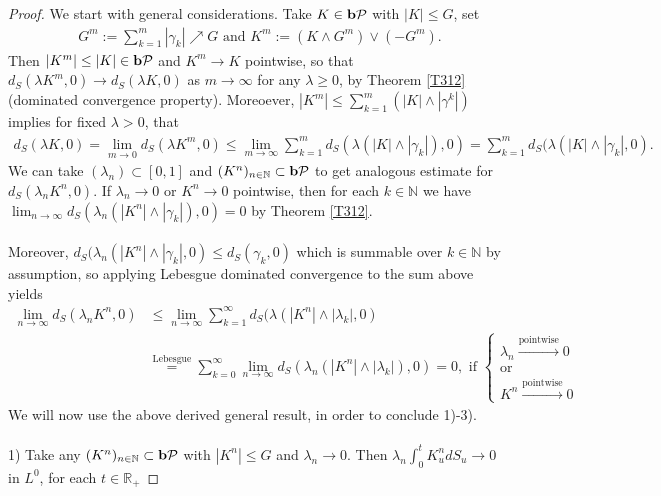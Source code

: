 \documentclass[12pt,a4paper, twoside]{article}
\theoremstyle{definition}
\newcommand{\pred}{\textbf{\text{b}}\mathcal{P}}
\begin{document}
\begin{proof}
We start with general considerations. Take $K \in \pred$ with $|K | \leq G$, set 
\begin{align*}
G^m:= \sum_{k=1}^m | \gamma_k| \nearrow G \text{ and } K^m:= (K \wedge G^m) \vee (- G^m).
\end{align*}
Then $|K^m| \leq |K| \in \pred$ and $K^m \to K$ pointwise,  so that $d_S( \lambda K^m,0) \to d_S( \lambda K,0)$ as $m \to \infty$ for any $\lambda \geq 0$, by Theorem \ref{T312} (dominated convergence property). Moreoever, $|K^m| \leq \sum_{k=1}^m ( |K| \wedge | \gamma^k|)$ implies for fixed $\lambda >0$, that 
\begin{align*}
d_S( \lambda K,0) = \lim_{m \to 0} d_S( \lambda K^m, 0) \leq \lim_{m \to \infty} \sum_{k=1}^m d_S( \lambda  (|K| \wedge |\gamma_k|),0) =  \sum_{k=1}^m d_S( \lambda ( |K| \wedge | \gamma_k|,0).
\end{align*}
\newpage
We can take $( \lambda_n) \subset [0,1]$ and $(K^n)_{n \in \mathbb{N}} \subset \pred$ to get analogous estimate for $d_S( \lambda_n K^n,0)$. If $\lambda_n \to 0$ or $K^n \to 0$ pointwise, then for each $k \in \mathbb{N}$ we have $\lim_{n \to \infty} d_S( \lambda_n ( |K^n| \wedge | \gamma_k|),0)=0$  by Theorem \ref{T312}. 
\\\\
Moreover, $d_S( \lambda_n( |K^n| \wedge | \gamma_k|,0) \leq d_S( \gamma_k,0)$ which is summable over $k \in \mathbb{N}$ by assumption, so applying Lebesgue dominated convergence to the sum above yields
\begin{align*}
\lim_{n \to \infty} d_S( \lambda_n K^n,0) &\leq \lim_{n \to \infty} \sum_{k=1}^\infty d_S( \lambda ( |K^n| \wedge | \lambda_k|,0) \\ &\overset{\text{Lebesgue}}= \sum_{k=0}^\infty \lim_{n \to \infty} d_S( \lambda_n ( |K^n| \wedge | \lambda_k|),0) =0, \text{ if } \begin{cases} \lambda_n \xrightarrow{\text{pointwise}} 0 \\ \text{or} \\ K^n \xrightarrow{\text{pointwise}} 0 \end{cases}
\end{align*}
We will now use the above derived general result, in order to conclude 1)-3).
\\
\\
1) Take any $(K^n)_{n \in \mathbb{N}} \subset \pred$ with $|K^n| \leq G$ and $\lambda_n \to 0$. Then $\lambda_n \int_0^t K_u^n dS_u \to 0$ in $L^0$, for each $t \in \mathbb{R}_+$ 

\end{proof}
\end{document}
